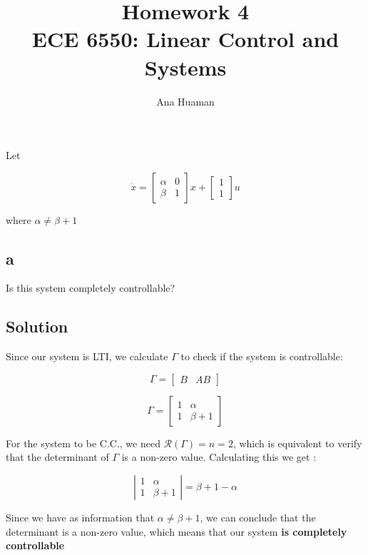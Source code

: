 \documentclass[10pt,a4paper]{article}
\author{Ana Huaman}
\title{\textbf{Homework 4} \\ ECE 6550: Linear Control and Systems}
\date{}
\begin{document}
\maketitle

\section{}
Let

\[
\dot{x} =
\begin{bmatrix}
\alpha & 0 \\
\beta & 1
\end{bmatrix}
x+ 
\begin{bmatrix}
1 \\
1
\end{bmatrix}
u
\]

where $\alpha \neq \beta + 1$

\subsection*{a}
Is this system completely controllable?

\subsection*{Solution}
Since our system is LTI, we calculate $\Gamma$ to check if the system is controllable:

\[
\Gamma = 
\begin{bmatrix}
B & AB
\end{bmatrix}
\]

\[
\Gamma = 
\begin{bmatrix}
1 & \alpha \\
1 & \beta + 1 
\end{bmatrix}
\]

For the system to be C.C., we need $\mathcal{R}(\Gamma) = n = 2$, which is equivalent to verify that the determinant of $\Gamma$ is a non-zero value. Calculating this we get	:

\[
\left |
\begin{matrix}
1 & \alpha \\
1 & \beta + 1
\end{matrix}
\right | = 
\beta +1-\alpha
\]

Since we have as information that $\alpha \neq \beta + 1$, we can conclude that the determinant is a non-zero value, which means that our system \textbf{is completely controllable}
\end{document}
